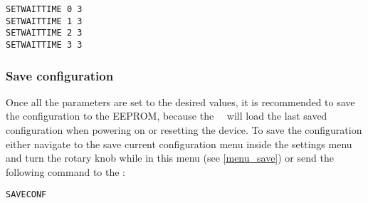 \texttt{SETWAITTIME 0 3}\\
\texttt{SETWAITTIME 1 3}\\
\texttt{SETWAITTIME 2 3}\\
\texttt{SETWAITTIME 3 3}

\subsubsection{Save configuration}
Once all the parameters are set to the desired values, it is recommended to save the configuration to the EEPROM, because the \productNumber ~\productName ~will load the last saved configuration when powering on or resetting the device. To save the configuration either navigate to the save current configuration menu inside the settings menu and turn the rotary knob while in this menu (see \ref{menu_save}) or send the following command to the \productName : 

\texttt{SAVECONF}

